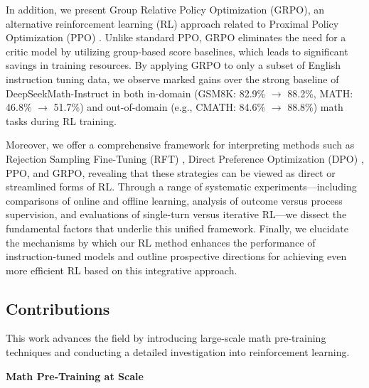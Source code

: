 In addition, we present Group Relative Policy Optimization (GRPO), an alternative reinforcement learning (RL) approach related to Proximal Policy Optimization (PPO) \citep{schulman2017proximal}. Unlike standard PPO, GRPO eliminates the need for a critic model by utilizing group-based score baselines, which leads to significant savings in training resources. By applying GRPO to only a subset of English instruction tuning data, we observe marked gains over the strong baseline of DeepSeekMath-Instruct in both in-domain (GSM8K: 82.9\% $\rightarrow$ 88.2\%, MATH: 46.8\% $\rightarrow$ 51.7\%) and out-of-domain (e.g., CMATH: 84.6\% $\rightarrow$ 88.8\%) math tasks during RL training. 

Moreover, we offer a comprehensive framework for interpreting methods such as Rejection Sampling Fine-Tuning (RFT) \citep{yuan2023scaling}, Direct Preference Optimization (DPO) \citep{dpo}, PPO, and GRPO, revealing that these strategies can be viewed as direct or streamlined forms of RL. Through a range of systematic experiments—including comparisons of online and offline learning, analysis of outcome versus process supervision, and evaluations of single-turn versus iterative RL—we dissect the fundamental factors that underlie this unified framework. Finally, we elucidate the mechanisms by which our RL method enhances the performance of instruction-tuned models and outline prospective directions for achieving even more efficient RL based on this integrative approach.

\subsection{Contributions}
This work advances the field by introducing large-scale math pre-training techniques and conducting a detailed investigation into reinforcement learning.

\textbf{Math Pre-Training at Scale}


